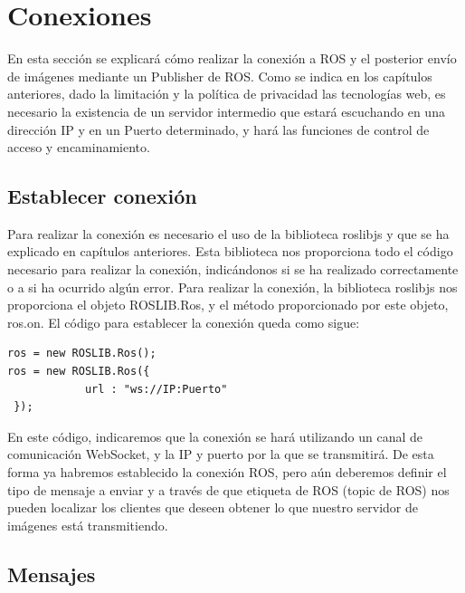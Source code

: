 \section{Conexiones}
En esta sección se explicará cómo realizar la  conexión a ROS y el posterior envío de imágenes mediante un Publisher de ROS. Como se indica en los capítulos anteriores, dado la limitación y la política de privacidad las tecnologías web, es necesario la existencia de un servidor intermedio que estará escuchando en una dirección IP y en un Puerto determinado, y hará las funciones de control de acceso y encaminamiento.

\subsection{Establecer conexión}
Para realizar la conexión es necesario el uso de la biblioteca roslibjs y que se ha explicado en capítulos anteriores. Esta biblioteca nos proporciona todo el código necesario para realizar la conexión, indicándonos si se ha realizado correctamente o a si ha ocurrido algún error. Para realizar la conexión, la biblioteca roslibjs nos proporciona el objeto ROSLIB.Ros, y el método proporcionado por este objeto, ros.on. El código para establecer la conexión queda como sigue:
\begin{lstlisting}[frame=single]
ros = new ROSLIB.Ros();
ros = new ROSLIB.Ros({
            url : "ws://IP:Puerto"
 });
\end{lstlisting}
En este código, indicaremos que la conexión se hará utilizando un canal de comunicación WebSocket, y la IP y puerto por la que se transmitirá. De esta forma ya habremos establecido la conexión ROS, pero aún deberemos definir el tipo de mensaje a enviar y a través de que etiqueta de ROS (topic de ROS) nos pueden localizar los clientes que deseen obtener lo que nuestro servidor de imágenes está transmitiendo.

\subsection{Mensajes}

